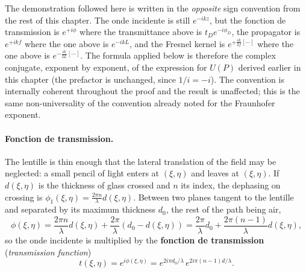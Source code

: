 \begin{remark}
  The demonstration followed here is written in the \emph{opposite} sign
  convention from the rest of this chapter. The onde incidente is still
  $e^{-ikz}$, but the fonction de transmission is $e^{+i\phi}$ where the
  transmittance above is $t_D e^{-i\phi_D}$, the propagator is $e^{+ikf}$ where
  the one above is $e^{-ikL}$, and the Fresnel kernel is
  $e^{+\frac{ik}{2f}[\cdots]}$ where the one above is
  $e^{-\frac{ik}{2L}[\cdots]}$. The formula applied below is therefore the
  complex conjugate, exponent by exponent, of the expression for $U(P)$ derived
  earlier in this chapter (the prefactor is unchanged, since $1/i = -i$). The
  convention is internally coherent throughout the proof and the result is
  unaffected; this is the same non-universality of the convention already noted
  for the Fraunhofer exponent.
\end{remark}

\paragraph{Fonction de transmission.} The lentille is thin enough that the
lateral translation of the field may be neglected: a small pencil of light
enters at $(\xi,\eta)$ and leaves at $(\xi,\eta)$. If $d(\xi,\eta)$ is the
thickness of glass crossed and $n$ its index, the dephasing on crossing is
$\phi_1(\xi,\eta) = \frac{2\pi n}{\lambda} d(\xi,\eta)$. Between two planes
tangent to the lentille and separated by its maximum thickness $d_0$, the rest
of the path being air,
\begin{equation*}
  \phi(\xi,\eta) = \frac{2\pi n}{\lambda} d(\xi,\eta)
                 + \frac{2\pi}{\lambda}\left(d_0 - d(\xi,\eta)\right)
                 = \frac{2\pi}{\lambda} d_0
                 + \frac{2\pi(n-1)}{\lambda} d(\xi,\eta),
\end{equation*}
so the onde incidente is multiplied by the \textbf{fonction de transmission}
(\textit{transmission function})
\begin{equation*}
  t(\xi,\eta) = e^{i\phi(\xi,\eta)}
              = e^{2i\pi d_0/\lambda}\, e^{2i\pi(n-1)d/\lambda}.
\end{equation*}

